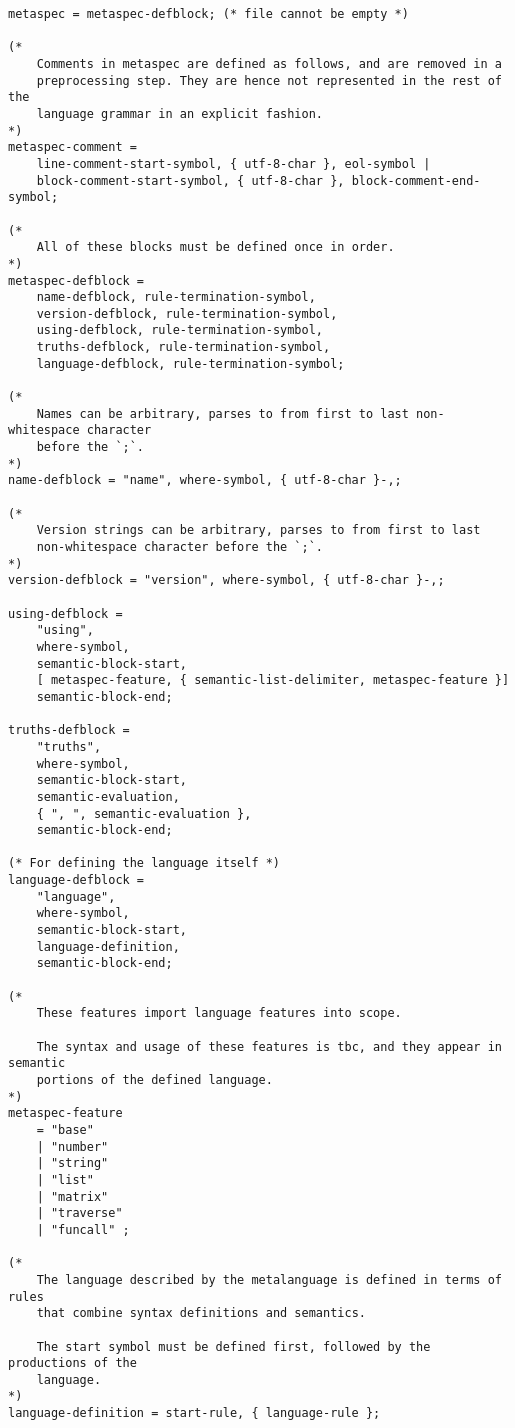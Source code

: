 \begin{verbatim}
metaspec = metaspec-defblock; (* file cannot be empty *)

(* 
    Comments in metaspec are defined as follows, and are removed in a 
    preprocessing step. They are hence not represented in the rest of the 
    language grammar in an explicit fashion. 
*)
metaspec-comment =
    line-comment-start-symbol, { utf-8-char }, eol-symbol |
    block-comment-start-symbol, { utf-8-char }, block-comment-end-symbol;

(* 
    All of these blocks must be defined once in order.
*)
metaspec-defblock = 
    name-defblock, rule-termination-symbol, 
    version-defblock, rule-termination-symbol, 
    using-defblock, rule-termination-symbol, 
    truths-defblock, rule-termination-symbol, 
    language-defblock, rule-termination-symbol;

(* 
    Names can be arbitrary, parses to from first to last non-whitespace character
    before the `;`.
*)
name-defblock = "name", where-symbol, { utf-8-char }-,;

(* 
    Version strings can be arbitrary, parses to from first to last 
    non-whitespace character before the `;`.
*)
version-defblock = "version", where-symbol, { utf-8-char }-,;

using-defblock =
    "using",
    where-symbol,
    semantic-block-start,
    [ metaspec-feature, { semantic-list-delimiter, metaspec-feature }]
    semantic-block-end;

truths-defblock =
    "truths",
    where-symbol, 
    semantic-block-start,
    semantic-evaluation,
    { ", ", semantic-evaluation },
    semantic-block-end;

(* For defining the language itself *)
language-defblock =
    "language",
    where-symbol,
    semantic-block-start,
    language-definition,
    semantic-block-end;

(* 
    These features import language features into scope.

    The syntax and usage of these features is tbc, and they appear in semantic
    portions of the defined language.
*)
metaspec-feature
    = "base"
    | "number"
    | "string"
    | "list"
    | "matrix"
    | "traverse"
    | "funcall" ;

(*
    The language described by the metalanguage is defined in terms of rules 
    that combine syntax definitions and semantics.

    The start symbol must be defined first, followed by the productions of the
    language.
*)
language-definition = start-rule, { language-rule };


\end{verbatim}

